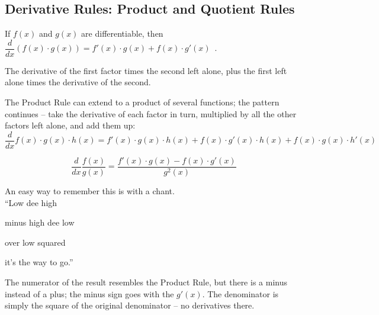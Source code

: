 \subsection{Derivative Rules: Product and Quotient Rules}
\begin{theorem}
If $f(x)$ and $g(x)$ are differentiable, then
$\dfrac{d}{dx}\left( f(x)\cdot g(x) \right)=f'(x)\cdot g(x)+f(x)\cdot g'(x) \enspace .$
\end{theorem}

The derivative of the first factor times the second left alone, plus the first left alone times the derivative of the second.

The Product Rule can extend to a product of several functions; the pattern continues -- take the derivative of each factor in turn, multiplied by all the other factors left alone, and add them up:
$$\dfrac{d}{dx} f(x)\cdot g(x)\cdot h(x) = f'(x)\cdot g(x)\cdot h(x)+f(x)\cdot g'(x)\cdot h(x)+f(x)\cdot g(x)\cdot h'(x)$$


\begin{theorem}
$$\dfrac{d}{dx}\dfrac{f(x)}{g(x)} = \dfrac{f'(x)\cdot g(x)-f(x)\cdot g'(x)}{g^2(x)}$$
\end{theorem}
An easy way to remember this is with a chant.\\

``Low dee high

minus high dee low

over low squared

it's the way to go.''

The numerator of the result resembles the Product Rule, but there is a minus instead of a plus; the minus sign goes with the $g'(x)$. The denominator is simply the square of the original denominator -- no derivatives there.

